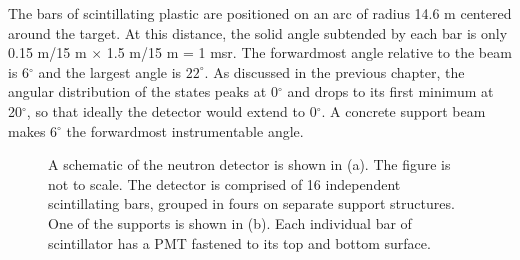 The bars of scintillating plastic are positioned on an arc of radius 14.6 m centered around the target.   At this distance, the solid angle subtended by each bar is only 0.15 m/15 m $\times$ 1.5 m/15 m = 1 msr.  The forwardmost angle relative to the beam is 6$^{\circ}$ and the largest angle is $22^{\circ}$.  As discussed in the previous chapter, the angular distribution of the \zp states peaks at 0$^{\circ}$ and drops to its first minimum at 20$^{\circ}$, so that ideally the detector would extend to 0$^{\circ}$.  A concrete support beam makes 6$^{\circ}$ the forwardmost instrumentable angle.
\begin{figure}[htp]
\centering
{}
\qquad
{}
\caption{A schematic of the neutron detector is shown in (a).  The figure is not to scale.  The detector is comprised of 16 independent scintillating bars, grouped in fours on separate support structures.  One of the supports is shown in (b).  Each individual bar of scintillator has a PMT fastened to its top and bottom surface.}
\label{fig:detectorGeometry}
\end{figure}

